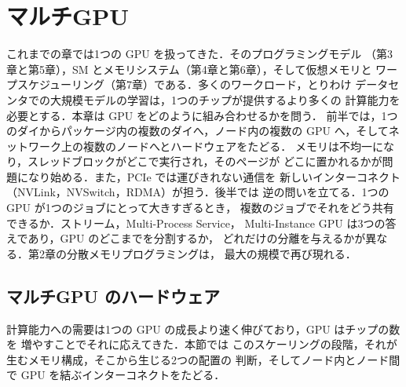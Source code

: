 \documentclass[../main.tex]{subfiles}
\begin{document}
\chapter{マルチGPU}

これまでの章では1つの GPU を扱ってきた．そのプログラミングモデル
（第3章と第5章），SM とメモリシステム（第4章と第6章），そして仮想メモリと
ワープスケジューリング（第7章）である．多くのワークロード，とりわけ
データセンタでの大規模モデルの学習は，1つのチップが提供するより多くの
計算能力を必要とする．本章は GPU をどのように組み合わせるかを問う．
前半では，1つのダイからパッケージ内の複数のダイへ，ノード内の複数の
GPU へ，そしてネットワーク上の複数のノードへとハードウェアをたどる．
メモリは不均一になり，スレッドブロックがどこで実行され，そのページが
どこに置かれるかが問題になり始める．また，PCIe では運びきれない通信を
新しいインターコネクト（NVLink，NVSwitch，RDMA）が担う．後半では
逆の問いを立てる．1つの GPU が1つのジョブにとって大きすぎるとき，
複数のジョブでそれをどう共有できるか．ストリーム，Multi-Process Service，
Multi-Instance GPU は3つの答えであり，GPU のどこまでを分割するか，
どれだけの分離を与えるかが異なる．第2章の分散メモリプログラミングは，
最大の規模で再び現れる．

\section{マルチGPU のハードウェア}
\label{sec:l09-hardware}

計算能力への需要は1つの GPU の成長より速く伸びており，GPU はチップの数を
増やすことでそれに応えてきた．本節では
このスケーリングの段階，それが生むメモリ構成，そこから生じる2つの配置の
判断，そしてノード内とノード間で GPU を結ぶインターコネクトをたどる．
\end{document}
